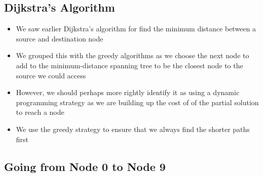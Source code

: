 \begin{slide}
\section{Dijkstra's Algorithm}

\begin{PauseHighLight}
  \begin{itemize}
  \item We saw earlier Dijkstra's algorithm for find the minimum distance
    between a source and destination node\pause
  \item We grouped this with the greedy algorithms as we choose the next
    node to add to the minimum-distance spanning tree to be the closest
    node to the source we could access\pause
  \item However, we should perhaps more rightly identify it as using a
    dynamic programming strategy as we are building up the cost of
    of the partial solution to reach a node\pause
  \item We use the greedy strategy to ensure that we always find the
    shorter paths first\pause
  \end{itemize}
\end{PauseHighLight}

\end{slide}


\begin{slide}
\section{Going from Node 0 to Node 9}

\pb\pause{}
\begin{center}
  \pause
\end{center}
\end{slide}


